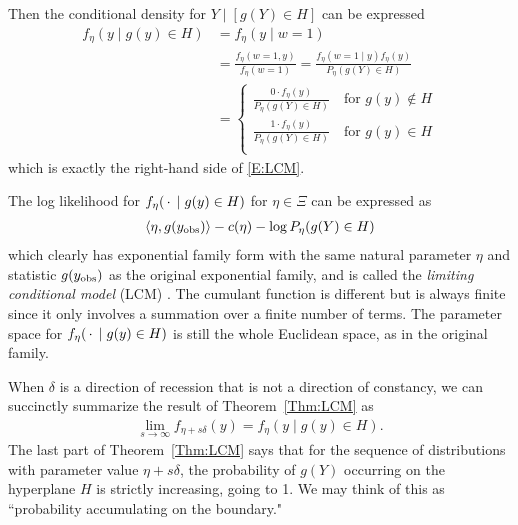 Then the conditional density for $Y \mid [g(Y)\in H]$ can be expressed
\begin{align*}
	f_\eta(y \mid g(y) \in H) &= f_\eta(y \mid w=1) \\
					&= \frac{f_\eta(w=1, y)}{f_\eta(w=1)}	
					= \frac{f_\eta(w=1 \mid y) f_\eta(y)}{P_\eta(g(Y) \in H)}  \\%
	&= \begin{cases}
 			\frac{0 \cdot f_\eta(y)}{P_\eta(g(Y) \in H)}   \quad 
					 \text{for $g(y) \notin H$}	\\
 			\frac{1 \cdot f_\eta(y)}{P_\eta(g(Y) \in H)}   \quad 
					 \text{for $g(y) \in H$}	\\
 		\end{cases}
\end{align*}
which is exactly the right-hand side of \eqref{E:LCM}.

The log likelihood for $f_\eta( \,\cdot\, \mid g(y) \in H)$ for $\eta \in \Xi$ can be expressed as
\begin{align*}
	\langle \eta, g(y_{\text{obs}}) \rangle - c(\eta) - \log P_\eta(g(Y) \in H) 
\end{align*}
which clearly has exponential family form with the same natural parameter $\eta$ and 
statistic $g(y_{\text{obs}})$ as the original exponential family,
and is called the \emph{limiting conditional model} (LCM) \citep{Geyer:gdor}.  
The cumulant function is different but is always finite since it only 
involves a summation over a finite number of terms.  The parameter space for 
$f_\eta( \,\cdot\, \mid g(y) \in H)$ is still the 
whole Euclidean space, as in the original family.  

When $\delta$ is a direction of recession that is not a direction of constancy, 
we can succinctly summarize the result of Theorem~\ref{Thm:LCM} as
\begin{align*}
\lim_{s \to \infty} f_{\eta+s\delta}(y) = f_{\eta}( y \mid g(y) \in H).
\end{align*}
The last part of Theorem~\ref{Thm:LCM} says that for the sequence of distributions with parameter 
value $\eta+s\delta$, the probability of $g(Y)$ occurring on the hyperplane $H$ is strictly 
increasing, going to 1.  We may think of this as 
``probability accumulating on the boundary."

